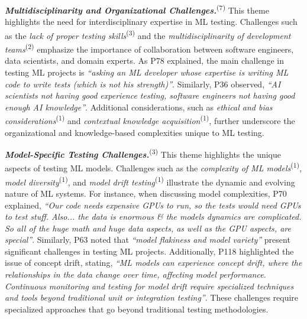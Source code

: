 \textbf{\textit{Multidisciplinarity and Organizational Challenges.}}\textsuperscript{(7)}
This theme highlights the need for interdisciplinary expertise in ML testing. Challenges such as the \textit{lack of proper testing skills}\textsuperscript{(3)} and the \textit{multidisciplinarity of development teams}\textsuperscript{(2)} emphasize the importance of collaboration between software engineers, data scientists, and domain experts.
As P78 explained, the main challenge in testing ML projects is \textit{``asking an ML developer whose expertise is writing ML code to write tests (which is not his strength)''}. Similarly, P36 observed, \textit{``AI scientists not having good experience testing, software engineers not having good enough AI knowledge''}.
Additional considerations, such as \textit{ethical and bias considerations}\textsuperscript{(1)} and \textit{contextual knowledge acquisition}\textsuperscript{(1)}, further underscore the organizational and knowledge-based complexities unique to ML testing. 

\textbf{\textit{Model-Specific Testing Challenges.}}\textsuperscript{(3)}
This theme highlights the unique aspects of testing ML models. Challenges such as the \textit{complexity of ML models}\textsuperscript{(1)}, \textit{model diversity}\textsuperscript{(1)}, and \textit{model drift testing}\textsuperscript{(1)} illustrate the dynamic and evolving nature of ML systems. 
For instance, when discussing model complexities, P70 explained, \textit{``Our code needs expensive GPUs to run, so the tests would need GPUs to test stuff. Also... the data is enormous \& the models dynamics are complicated. So all of the huge math and huge data aspects, as well as the GPU aspects, are special''}. Similarly, P63 noted that \textit{``model flakiness and model variety''} present significant challenges in testing ML projects. Additionally, P118 highlighted the issue of concept drift, stating, \textit{``ML models can experience concept drift, where the relationships in the data change over time, affecting model performance. Continuous monitoring and testing for model drift require specialized techniques and tools beyond traditional unit or integration testing''}.
These challenges require specialized approaches that go beyond traditional testing methodologies.


